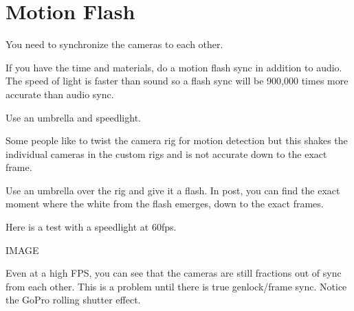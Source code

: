 \chapter{Motion Flash}
\pagecolor{white}
\label{chap:23}
\begin{fullwidth}


\problem

{\large You need to synchronize the cameras to each other. 

 \par}

If you have the time and materials, do a motion flash sync in addition to audio. The speed of light is faster than sound so a flash sync will be 900,000 times more accurate than audio sync. 

\solution

{\large Use an umbrella and speedlight.

 \par}

Some people like to twist the camera rig for motion detection but this shakes the individual cameras in the custom rigs and is not accurate down to the exact frame. 

Use an umbrella over the rig and give it a flash. In post, you can find the exact moment where the white from the flash emerges, down to the exact frames. 

Here is a test with a speedlight at 60fps. 

IMAGE

Even at a high FPS, you can see that the cameras are still fractions out of sync from each other. This is a problem until there is true genlock/frame sync. Notice the GoPro rolling shutter effect. 

\clearpage
\end{fullwidth}
